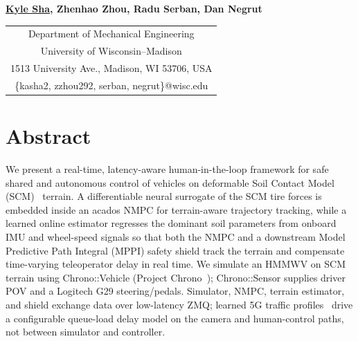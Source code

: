 \documentclass{acmd2026_abstract}
\begin{document}
\begin{center}
\end{center}
\vspace{-6pt}

\begin{center}
\normalsize{
  \bf{
    \underline{Kyle Sha},
    Zhenhao Zhou,
    Radu Serban,
    Dan Negrut}
}
\end{center}
\vspace{-6pt}

\begin{center}
  \begin{tabular}{c}
    Department of Mechanical Engineering             \\
    University of Wisconsin--Madison                 \\
    1513 University Ave., Madison, WI 53706, USA     \\
    \{kasha2, zzhou292, serban, negrut\}@wisc.edu    \\
  \end{tabular}
\end{center}
\vspace{-8pt}

\section*{Abstract}
We present a real-time, latency-aware human-in-the-loop framework
for safe shared and autonomous control of vehicles on deformable
Soil Contact Model (SCM)~\cite{Krenn09} terrain.  A differentiable
neural surrogate of the SCM tire forces is embedded inside an
acados NMPC for terrain-aware trajectory tracking, while a
learned online estimator regresses the dominant soil parameters
from onboard IMU and wheel-speed signals so that both the NMPC
and a downstream Model Predictive Path Integral (MPPI) safety
shield track the terrain and compensate time-varying teleoperator
delay in real time.  We simulate an HMMWV on
SCM terrain using Chrono::Vehicle (Project Chrono~\cite{Tasora16});
Chrono::Sensor supplies driver POV and a Logitech G29 steering/pedals.
Simulator, NMPC, terrain estimator, and shield exchange data over
low-latency ZMQ; learned 5G traffic profiles~\cite{Choi23}
drive a configurable queue-load delay model on the camera and
human-control paths, not between simulator and controller.
\end{document}
